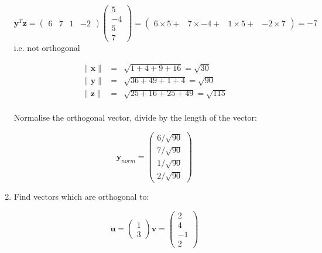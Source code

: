 \documentclass{article}
\begin{document}
\begin{enumerate}
\begin{displaymath}
\boldsymbol{y}^{T}\boldsymbol{z} = \left( \begin{array}{rrrr}6 & 7 & 1 & -2 \end{array} \right) \left( \begin{array}{r} 5 \\ -4 \\ 5 \\ 7 \end{array} \right) = \left( \begin{array}{rrrr} 6 \times 5 + & 7 \times -4 + & 1 \times 5 + & -2 \times 7 \end{array} \right) = -7
\end{displaymath}
i.e. not orthogonal


\begin{eqnarray*}
\lVert \boldsymbol{x} \rVert &=& \sqrt{1 + 4 + 9 + 16} = \sqrt{30} \\
\lVert \boldsymbol{y} \rVert &=& \sqrt{36 + 49 + 1 + 4} = \sqrt{90}\\
\lVert \boldsymbol{z} \rVert &=& \sqrt{25 + 16 + 25 + 49} = \sqrt{115} \\
\end{eqnarray*}

Normalise the orthogonal vector, divide by the length of the vector:

\begin{displaymath}
\boldsymbol{y}_{norm} = \left( \begin{array}{r} 6/\sqrt{90} \\7/\sqrt{90} \\ 1/\sqrt{90} \\ 2/\sqrt{90} \end{array} \right)
\end{displaymath}


\item Find vectors which are orthogonal to:


\begin{displaymath}
\boldsymbol{u} =  \left( \begin{array}{r} 1 \\ 3 \end{array} \right)
\boldsymbol{v} = \left( \begin{array}{r} 2 \\ 4 \\ -1 \\ 2 \end{array} \right)
\end{displaymath}


\end{enumerate}
\end{document}
